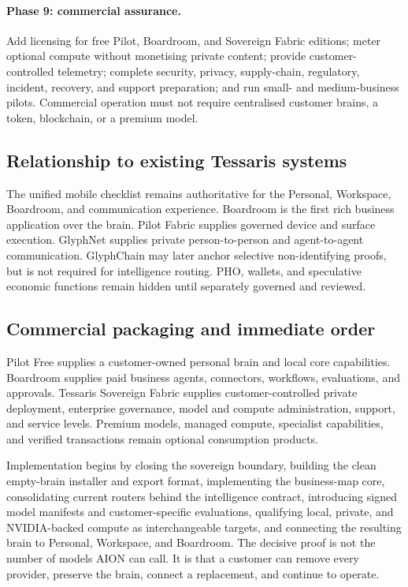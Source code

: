 \paragraph{Phase 9: commercial assurance.}
Add licensing for free Pilot, Boardroom, and Sovereign Fabric editions; meter
optional compute without monetising private content; provide customer-controlled
telemetry; complete security, privacy, supply-chain, regulatory, incident,
recovery, and support preparation; and run small- and medium-business pilots.
Commercial operation must not require centralised customer brains, a token,
blockchain, or a premium model.

\subsection{Relationship to existing Tessaris systems}

The unified mobile checklist remains authoritative for the Personal, Workspace,
Boardroom, and communication experience.  Boardroom is the first rich business
application over the brain.  Pilot Fabric supplies governed device and surface
execution.  GlyphNet supplies private person-to-person and agent-to-agent
communication.  GlyphChain may later anchor selective non-identifying proofs,
but is not required for intelligence routing.  PHO, wallets, and speculative
economic functions remain hidden until separately governed and reviewed.

\subsection{Commercial packaging and immediate order}

Pilot Free supplies a customer-owned personal brain and local core capabilities.
Boardroom supplies paid business agents, connectors, workflows, evaluations,
and approvals.  Tessaris Sovereign Fabric supplies customer-controlled private
deployment, enterprise governance, model and compute administration, support,
and service levels.  Premium models, managed compute, specialist capabilities,
and verified transactions remain optional consumption products.

Implementation begins by closing the sovereign boundary, building the clean
empty-brain installer and export format, implementing the business-map core,
consolidating current routers behind the intelligence contract, introducing
signed model manifests and customer-specific evaluations, qualifying local,
private, and NVIDIA-backed compute as interchangeable targets, and connecting
the resulting brain to Personal, Workspace, and Boardroom.  The decisive proof
is not the number of models AION can call.  It is that a customer can remove
every provider, preserve the brain, connect a replacement, and continue to
operate.
